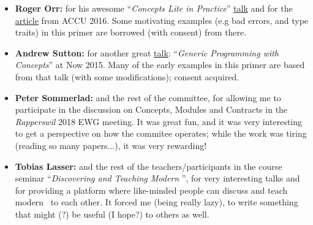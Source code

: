 \begin{itemize}
    \item{\textbf{Roger Orr:} for his awesome ``\emph{Concepts Lite in Practice}'' \href{https://www.youtube.com/watch?v=S1Z-RbygAlw}{talk} and for the \href{https://accu.org/index.php/journals/2246}{article} from ACCU 2016. Some motivating examples (e.g bad errors, and type traits) in this primer are borrowed (with consent) from there.}
    \item{\textbf{Andrew Sutton:} for another great \href{https://www.youtube.com/watch?v=_rBhX-FJCdg}{talk}: ``\emph{Generic Programming with Concepts}'' at \Cpp Now 2015. Many of the early examples in this primer are based from that talk (with some modifications); consent acquired.}
    \item{\textbf{Peter Sommerlad:} and the rest of the committee, for allowing me to participate in the discussion on Concepts, Modules and Contracts in the \emph{Rapperswil} 2018 EWG meeting. It was great fun, and it was very interesting to get a perspective on how the commitee operates; while the work was tiring (reading so many papers...), it was very rewarding!}
    \item{\textbf{Tobias Lasser:} and the rest of the teachers/participants in the course seminar ``\emph{Discovering and Teaching Modern \Cpp}'', for very interesting talks and for providing a platform where like-minded people can discuss and teach modern \Cpp\ to each other. It forced me (being really lazy), to write something that might (?) be useful (I hope?) to others as well.}
\end{itemize}
